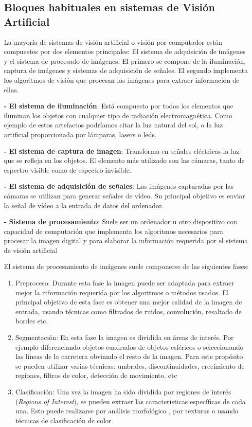 \subsection{Bloques habituales en sistemas de Visión Artificial}
La mayoría de sistemas de visión artificial o visión por computador están compuestos por dos elementos principales:  El sistema de adquisición de imágenes y el sistema de procesado de imágenes. El primero se compone de la iluminación, captura de imágenes y sistemas de adquisición de señales. El segundo implementa los algoritmos de visión que procesan las imágenes para extraer información de ellas.

	\textbf{- El sistema de iluminación}: Está compuesto por todos los elementos que iluminan los objetos con cualquier tipo de radiación electromagnética. Como ejemplo de estos artefactos podríamos citar la luz natural del sol, o la luz artificial proporcionada por lámparas, lasers o leds.

	\textbf{- El sistema de captura de imagen}: Transforma en señales eléctricas la luz que se refleja en los objetos. El elemento más utilizado son las cámaras, tanto de espectro visible como de espectro invisible.

	\textbf{- El sistema de adquisición de señales}: Las imágenes capturadas por las cámaras se utilizan para generar señales de vídeo. Su principal objetivo es enviar la señal de vídeo a la entrada de datos del ordenador.

	\textbf{- Sistema de procesamiento}: Suele ser un ordenador u otro dispositivo con capacidad de computación que implementa los algoritmos necesarios para procesar la imagen digital y para elaborar la información requerida por el sistema de visión artificial

	El sistema de procesamiento de imágenes suele componerse de las siguientes fases:
    \begin{enumerate}
		\item{Preproceso}: Durante esta fase la imagen puede ser adaptada para extraer mejor la información requerida por los algoritmos o métodos usados. El principal objetivo de esta fase es obtener una mejor calidad de la imagen de entrada, usando técnicas como filtrados de ruidos, convolución, resaltado de bordes etc.

		\item{Segmentación}: En esta fase la imagen es dividida en áreas de interés. Por ejemplo diferenciando objetos cuadrados de objetos esféricos o seleccionando las líneas de la carretera obviando el resto de la imagen. Para este propósito se pueden utilizar varias técnicas: umbrales, discontinuidades, crecimiento de regiones, filtros de color, detección de movimiento, etc

		\item{Clasificación}: Una vez la imagen ha sido dividida por regiones de interés (\textit{Regions of Interest}), se pueden extraer las características específicas de cada una. Esto puede realizarse por análisis morfológico , por texturas o usando técnicas de clasificación de color.
	\end{enumerate}

